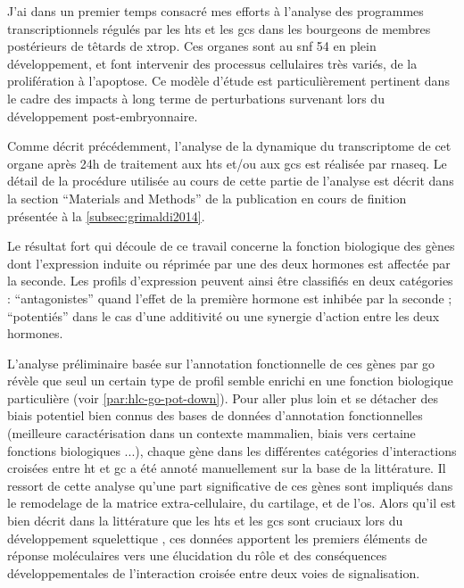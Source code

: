 \documentclass[../main.tex]{subfiles}
\begin{document}
J'ai dans un premier temps consacré mes efforts à l'analyse des programmes transcriptionnels régulés par les \glspl{ht} et les \glspl{gc} dans les bourgeons de membres postérieurs de têtards de \gls{xtrop}.
Ces organes sont au \gls{snf} 54 en plein développement, et font intervenir des processus cellulaires très variés, de la prolifération à l'apoptose.
Ce modèle d'étude est particulièrement pertinent dans le cadre des impacts à long terme de perturbations survenant lors du développement post-embryonnaire.
\par
Comme décrit précédemment, l'analyse de la dynamique du transcriptome de cet organe après 24h de traitement aux \glspl{ht} et/ou aux \glspl{gc} est réalisée par \gls{rnaseq}.
Le détail de la procédure utilisée au cours de cette partie de l'analyse est décrit dans la section ``Materials and Methods'' de la publication en cours de finition présentée à la \autoref{subsec:grimaldi2014}.
\par
Le résultat fort qui découle de ce travail concerne la fonction biologique des gènes dont l'expression induite ou réprimée par une des deux hormones est affectée par la seconde.
Les profils d'expression peuvent ainsi être classifiés en deux catégories :
``antagonistes'' quand l'effet de la première hormone est inhibée par la seconde ; ``potentiés'' dans le cas d'une additivité ou une synergie d'action entre les deux hormones.
\par
L'analyse préliminaire basée sur l'annotation fonctionnelle de ces gènes par \gls{go} révèle que seul un certain type de profil semble enrichi en une fonction biologique particulière (voir \autoref{par:hlc-go-pot-down}).
Pour aller plus loin et se détacher des biais potentiel bien connus des bases de données d'annotation fonctionnelles (meilleure caractérisation dans un contexte mammalien, biais vers certaine fonctions biologiques ...), chaque gène dans les différentes catégories d'interactions croisées entre \gls{ht} et \gls{gc} a été annoté manuellement sur la base de la littérature.
Il ressort de cette analyse qu'une part significative de ces gènes sont impliqués dans le remodelage de la matrice extra-cellulaire, du cartilage, et de l'os.
Alors qu'il est bien décrit dans la littérature que les \glspl{ht} et les \glspl{gc} sont cruciaux lors du développement squelettique \citep{Robson2002,Wojcicka2013a}, ces données apportent les premiers éléments de réponse moléculaires vers une élucidation du rôle et des conséquences développementales de l'interaction croisée entre deux voies de signalisation.
\end{document}
